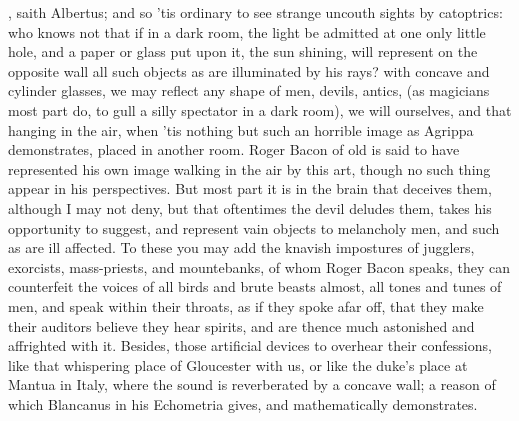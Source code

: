 {, \etc{} saith Albertus; and so 'tis ordinary to see
strange uncouth sights by catoptrics: who knows not that if in a dark room, the
light be admitted at one only little hole, and a paper or glass put upon it,
the sun shining, will represent on the opposite wall all such objects as are
illuminated by his rays? with concave and cylinder glasses, we may reflect any
shape of men, devils, antics, (as magicians most part do, to gull a silly
spectator in a dark room), we will ourselves, and that hanging in the air, when
'tis nothing but such an horrible image as Agrippa
demonstrates, placed in another room. Roger Bacon of old is said to have
represented his own image walking in the air by this art, though no such thing
appear in his perspectives. But most part it is in the brain that deceives
them, although I may not deny, but that oftentimes the devil deludes them,
takes his opportunity to suggest, and represent vain objects to melancholy men,
and such as are ill affected. To these you may add the knavish impostures of
jugglers, exorcists, mass-priests, and mountebanks, of whom Roger Bacon speaks,
\etc{} 
they can counterfeit the voices of all birds and brute
beasts almost, all tones and tunes of men, and speak within their throats, as
if they spoke afar off, that they make their auditors believe they hear
spirits, and are thence much astonished and affrighted with it. Besides, those
artificial devices to overhear their confessions, like that whispering place of
Gloucester with us, or like the duke's place at Mantua in
Italy, where the sound is reverberated by a concave wall; a reason of which
Blancanus in his Echometria gives, and mathematically demonstrates.

}
